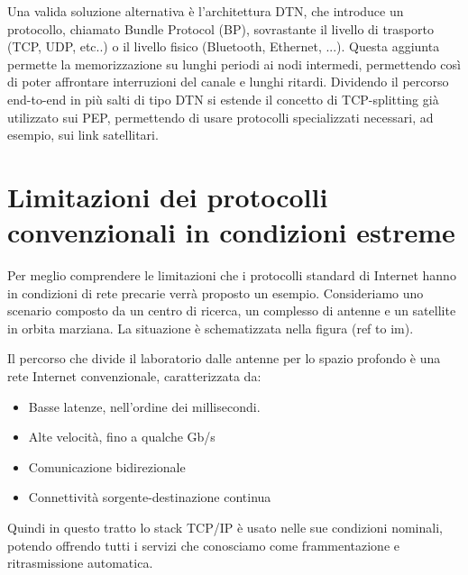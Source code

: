 \documentclass[12pt,a4paper,oneside]{book}
\begin{document}
		Una valida soluzione alternativa è l'architettura DTN, che introduce un protocollo, chiamato Bundle Protocol (BP), sovrastante il livello di trasporto (TCP, UDP, etc..) o il livello fisico (Bluetooth, Ethernet, ...). Questa aggiunta permette la memorizzazione su lunghi periodi ai nodi intermedi, permettendo così di poter affrontare interruzioni del canale e lunghi ritardi. Dividendo il percorso end-to-end in più salti di tipo DTN si estende il concetto di TCP-splitting già utilizzato sui PEP, permettendo di usare protocolli specializzati necessari, ad esempio, sui link satellitari.
		
		\section{Limitazioni dei protocolli convenzionali in condizioni estreme}
		
		Per meglio comprendere le limitazioni che i protocolli standard di Internet hanno in condizioni di rete precarie verrà proposto un esempio. Consideriamo uno scenario composto da un centro di ricerca, un complesso di antenne e un satellite in orbita marziana. La situazione è schematizzata nella figura (ref to im). 
		
		Il percorso che divide il laboratorio dalle antenne per lo spazio profondo è una rete Internet convenzionale, caratterizzata da:
		\begin{itemize}
			\item Basse latenze, nell'ordine dei millisecondi.
			\item Alte velocità, fino a qualche Gb/s
			\item Comunicazione bidirezionale
			\item Connettività sorgente-destinazione continua
		\end{itemize}
		Quindi in questo tratto lo stack TCP/IP è usato nelle sue condizioni nominali, potendo offrendo tutti i servizi che conosciamo come frammentazione e ritrasmissione automatica. 
		
\end{document}
